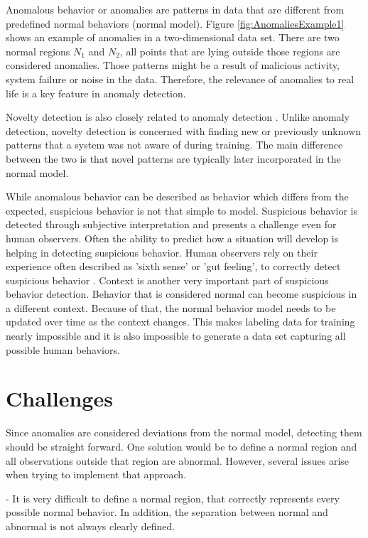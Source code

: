 Anomalous behavior or anomalies are patterns in data that are different from predefined normal behaviors (normal model). Figure \ref{fig:AnomaliesExample1} shows an example of anomalies in a two-dimensional data set. There are two normal regions \(N_{1}\) and \(N_{2}\), all points that are lying outside those regions are considered anomalies. Those patterns might be a result of malicious activity, system failure or noise in the data. Therefore, the relevance of anomalies to real life is a key feature in anomaly detection.

Novelty detection is also closely related to anomaly detection \cite{n16,n17}. Unlike anomaly detection, novelty detection is concerned with finding new or previously unknown patterns that a system was not aware of during training. The main difference between the two is that novel patterns are typically later incorporated in the normal model.

While anomalous behavior can be described as behavior which differs from the expected, suspicious behavior is not that simple to model. Suspicious behavior is detected through subjective interpretation and presents a challenge even for human observers. Often the ability to predict how a situation will develop is helping in detecting suspicious behavior. Human observers rely on their experience often described as 'sixth sense' or 'gut feeling', to correctly detect suspicious behavior \cite{n18}. Context is another very important part of suspicious behavior detection. Behavior that is considered normal can become suspicious in a different context. Because of that, the normal behavior model needs to be updated over time as the context changes. This makes labeling data for training nearly impossible and it is also impossible to generate a data set capturing all possible human behaviors.


\section{Challenges}

Since anomalies are considered deviations from the normal model, detecting them should be straight forward. One solution would be to define a normal region and all observations outside that region are abnormal. However, several issues arise when trying to implement that approach.

- It is very difficult to define a normal region, that correctly represents every possible normal behavior. In addition, the separation between normal and abnormal is not always clearly defined.

